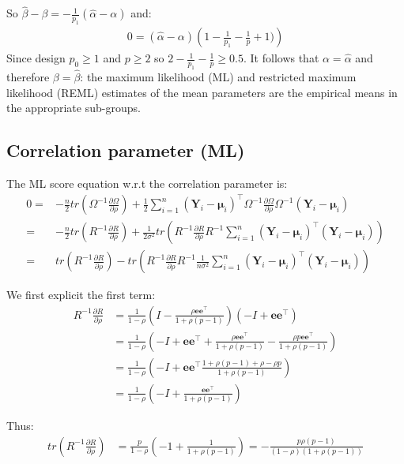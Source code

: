 \documentclass[12pt]{article}
\newcommand\Ve{\mathbf{e}}
\newcommand\VY{\mathbf{Y}}
\newcommand\Vmu{\boldsymbol{\mu}}
\newcommand\trans[1]{{#1}^\intercal}%
\begin{document}
So \(\widehat{\beta} - \beta = -\frac{1}{p_1}(\widehat{\alpha} - \alpha)\) and:
\begin{align*}
0 = (\widehat{\alpha} - \alpha)\left(1-\frac{1}{p_1}-\frac{1}{p}+1) \right)
\end{align*}
Since design \(p_0 \geq 1\) and \(p \geq 2\) so \(2-\frac{1}{p_1}-\frac{1}{p} \geq 0.5\). It
follows that \(\alpha = \widehat{\alpha}\) and therefore
\(\beta=\widehat{\beta}\): the maximum likelihood (ML) and restricted
maximum likelihood (REML) estimates of the mean parameters are the
empirical means in the appropriate sub-groups.

\subsection{Correlation parameter (ML)}
\label{sec:org72e871c}

The ML score equation w.r.t the correlation parameter is:
\begin{align*}
0 =& -\frac{n}{2} tr\left(\Omega^{-1} \frac{\partial \Omega}{\partial\rho}\right) + \frac{1}{2} \sum_{i=1}^n \trans{(\VY_i-\Vmu_i)} \Omega^{-1} \frac{\partial \Omega}{\partial \rho} \Omega^{-1} (\VY_i-\Vmu_i) \\
  =& -\frac{n}{2} tr\left(R^{-1} \frac{\partial R}{\partial\rho}\right) + \frac{1}{2\sigma^2} tr\left(R^{-1} \frac{\partial R}{\partial \rho} R^{-1} \sum_{i=1}^n \trans{(\VY_i-\Vmu_i)}  (\VY_i-\Vmu_i)\right) \\
  =& tr\left(R^{-1} \frac{\partial R}{\partial\rho}\right) - tr\left(R^{-1} \frac{\partial R}{\partial \rho} R^{-1} \frac{1}{n \sigma^2}\sum_{i=1}^n \trans{(\VY_i-\Vmu_i)} (\VY_i-\Vmu_i) \right) 
\end{align*}


We first explicit the first term:
\begin{align*}
R^{-1} \frac{\partial R}{\partial\rho} &= \frac{1}{1-\rho} \left(I - \frac{\rho \Ve\trans{\Ve}}{1+\rho(p-1)}\right)\left(-I + \Ve\trans{\Ve}\right) \\
&= \frac{1}{1-\rho} \left(-I + \Ve\trans{\Ve} + \frac{\rho \Ve\trans{\Ve}}{1+\rho(p-1)} - \frac{\rho p \Ve\trans{\Ve}}{1+\rho(p-1)}\right)\\
&= \frac{1}{1-\rho} \left(-I + \Ve\trans{\Ve} \frac{1+\rho(p-1)+\rho-\rho p}{1+\rho(p-1)}\right)\\
&= \frac{1}{1-\rho} \left(-I +  \frac{\Ve\trans{\Ve}}{1+\rho(p-1)}\right)
\end{align*}

Thus:
\begin{align*}
tr \left( R^{-1} \frac{\partial R}{\partial\rho} \right) &= \frac{p}{1-\rho}\left(-1+\frac{1}{1+\rho(p-1)}\right) = -\frac{p\rho(p-1)}{(1-\rho)(1+\rho(p-1))}
\end{align*}
\end{document}
